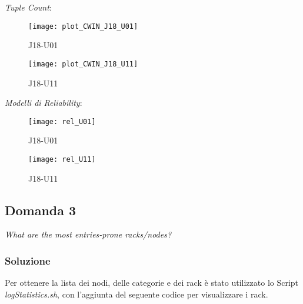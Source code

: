 \textit{Tuple Count}:

\begin{minipage}{\linewidth}
  \begin{minipage}{\linewidth}
    \begin{figure}[H]
      \texttt{[image: plot\_CWIN\_J18\_U01]}
      \caption*{J18-U01}
    \end{figure}
  \end{minipage}
  \begin{minipage}{\linewidth}
    \begin{figure}[H]
      \texttt{[image: plot\_CWIN\_J18\_U11]}
      \caption*{J18-U11}
    \end{figure}
  \end{minipage}
\end{minipage}

\clearpage

\textit{Modelli di Reliability}:

\begin{minipage}{\linewidth}
  \centering
  \begin{minipage}{.7\linewidth}
    \begin{figure}[H]
      \texttt{[image: rel\_U01]}
      \caption*{J18-U01}
    \end{figure}
  \end{minipage}

  \begin{minipage}{.7\linewidth}
    \begin{figure}[H]
      \texttt{[image: rel\_U11]}
      \caption*{J18-U11}
    \end{figure}
  \end{minipage}
\end{minipage}

\clearpage

\subsection{Domanda 3}
\textit{What are the most entries-prone racks/nodes?}\\

\subsubsection*{Soluzione}

 Per ottenere la lista dei nodi, delle categorie e dei rack è stato utilizzato lo Script
 \textit{logStatistics.sh}, con l'aggiunta del seguente codice per visualizzare
 i rack.\\

